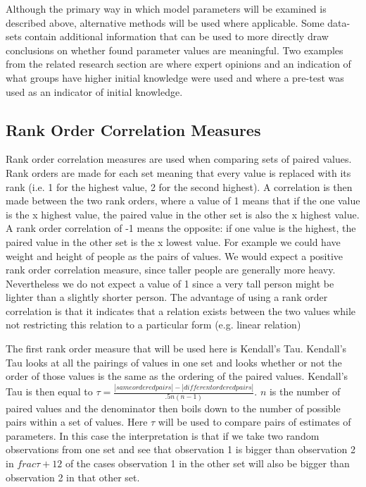 \documentclass{scrartcl}
\begin{document}
Although the primary way in which model parameters will be examined is described above, alternative methods will be used where applicable. Some data-sets contain additional information that can be used to more directly draw conclusions on whether found parameter values are meaningful. Two examples from the related research section are \cite{eirt} where expert opinions and an indication of what groups have higher initial knowledge were used and \cite{ktpfa} where a pre-test was used as an indicator of initial knowledge.

\subsection{Rank Order Correlation Measures}
Rank order correlation measures are used when comparing sets of paired values. Rank orders are made for each set meaning that every value is replaced with its rank (i.e. 1 for the highest value, 2 for the second highest). A correlation is then made between the two rank orders, where a value of 1 means that if the one value is the x highest value, the paired value in the other set is also the x highest value. A rank order correlation of -1 means the opposite: if one value is the  highest, the paired value in the other set is the x lowest value. For example we could have weight and height of people as the pairs of values. We would expect a positive rank order correlation measure, since taller people are generally more heavy. Nevertheless we do not expect a value of 1 since a very tall person might be lighter than a slightly shorter person. The advantage of using a rank order correlation is that it indicates that a relation exists between the two values while not restricting this relation to a particular form (e.g. linear relation)

The first rank order measure that will be used here is Kendall's Tau. Kendall's Tau looks at all the pairings of values in one set and looks whether or not the order of those values is the same as the ordering of the paired values. Kendall's Tau is then equal to $\tau=\frac{|same ordered pairs|-|different ordered pairs|}{.5 n (n-1)}$. $n$ is the number of paired values and the  denominator then boils down to the number of possible pairs within a set of values. Here $\tau$ will be used to compare pairs of estimates of parameters. In this case the interpretation is that if we take two random observations from one set and see that observation 1 is bigger than observation 2 in $frac{\tau+1}{2}$ of the cases observation 1 in the other set will also be bigger than observation 2 in that other set.
\end{document}
